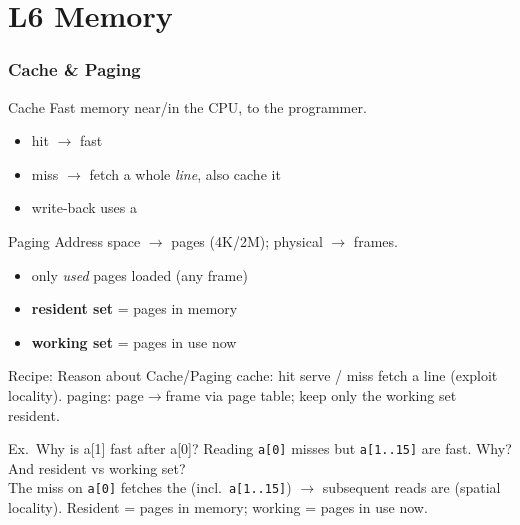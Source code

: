 \section{L6 Memory}

\subsubsection{Cache \& Paging}


\begin{definition}{Cache}
    Fast memory near/in the CPU,  to the programmer.
    \begin{itemize}
        \item hit $\to$ fast
        \item miss $\to$ fetch a whole \emph{line}, also cache it
        \item write-back uses a 
    \end{itemize}
\end{definition}

\begin{definition}{Paging}
    Address space $\to$ pages (4K/2M); physical $\to$ frames.
    \begin{itemize}
        \item only \emph{used} pages loaded (any frame)
        \item \textbf{resident set} = pages in memory
        \item \textbf{working set} = pages in use now
    \end{itemize}
\end{definition}

\multend

\begin{KR}{Recipe: Reason about Cache/Paging}
    cache: hit serve / miss fetch a line (exploit locality). paging: page$\to$frame via page table; keep only the working set resident.
\end{KR}

\begin{example2}{Ex.\ Why is a[1] fast after a[0]?}
    Reading \texttt{a[0]} misses but \texttt{a[1..15]} are fast. Why? And resident vs working set?
     \\ 
    The miss on \texttt{a[0]} fetches the  (incl.\ \texttt{a[1..15]}) $\to$ subsequent reads are  (spatial locality). Resident = pages in memory; working = pages in use now.
\end{example2}

